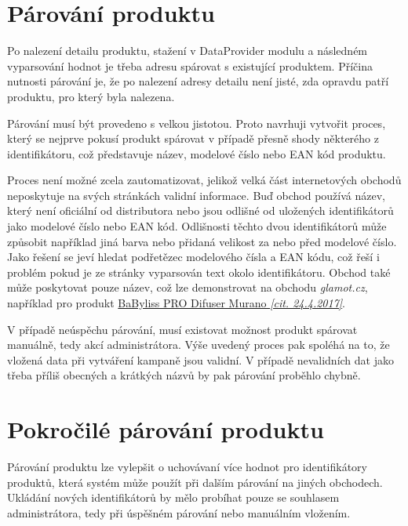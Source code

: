 \documentclass[thesis=B,czech]{FITthesis}[2012/06/26]
\begin{document}
\section{Párování produktu}
Po nalezení detailu produktu, stažení v DataProvider modulu a následném vyparsování hodnot je třeba adresu spárovat s 
existující produktem. Příčina nutnosti párování je, že po nalezení adresy detailu není jisté, zda opravdu patří produktu, pro který 
byla nalezena. 
\par
Párování musí být provedeno s velkou jistotou. Proto navrhuji vytvořit proces, který se nejprve pokusí produkt spárovat v případě 
přesně shody některého z identifikátoru, což představuje název, modelové číslo nebo EAN kód produktu. 
\par
Proces není možné zcela zautomatizovat, jelikož velká část internetových obchodů neposkytuje na svých stránkách validní informace.\cite{hunka}
Buď obchod používá název, který není oficiální od distributora nebo jsou odlišné od uložených identifikátorů jako 
modelové číslo nebo EAN kód. Odlišnosti těchto dvou identifikátorů může způsobit například jiná barva nebo přidaná velikost za nebo před modelové
číslo. Jako řešení se jeví hledat podřetězec modelového čísla a EAN kódu, což řeší i problém pokud je ze stránky vyparsován text okolo
identifikátoru. Obchod také může poskytovat pouze název, což lze demonstrovat na obchodu \textit{glamot.cz}, například
pro produkt 
\href{https://www.glamot.cz/p/19128/difuzer-k-vysouseci-babyliss-pro-difuser-murano}{BaByliss PRO Difuser Murano \textit{[cit. 24.4.2017]}}.
\par
V případě neúspěchu párování, musí existovat možnost produkt spárovat manuálně, tedy akcí administrátora. 
Výše uvedený proces pak spoléhá na to, že vložená data při vytváření kampaně jsou validní. V případě nevalidních dat jako třeba
příliš obecných a krátkých názvů by pak párování proběhlo chybně.

\section{Pokročilé párování produktu}
Párování produktu lze vylepšit o uchovávaní více hodnot pro identifikátory produktů, která systém může použít při dalším 
párování na jiných obchodech. Ukládání nových identifikátorů by mělo probíhat pouze se souhlasem administrátora, tedy 
při úspěšném párování nebo manuálním vložením.
\end{document}
